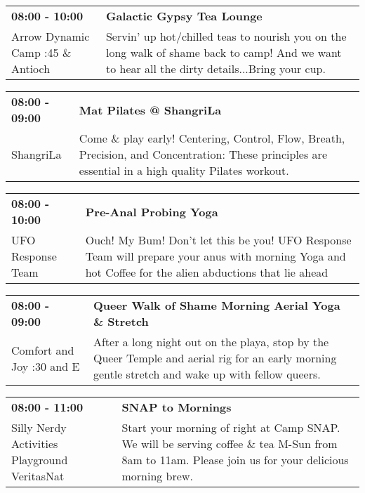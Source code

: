 \begin{tabular}{ p{1in} p{2.2in} }
    \textbf{08:00 - 10:00} & \textbf{Galactic Gypsy Tea Lounge} \\
    Arrow Dynamic Camp \newline 9:45 \& Antioch & Servin' up hot/chilled teas to nourish you on the long walk of shame back to camp! And we want to hear all the dirty details...Bring your cup. \\
    \hline 
\end{tabular}
    
\begin{tabular}{ p{1in} p{2.2in} }
    \textbf{08:00 - 09:00} & \textbf{Mat Pilates @ ShangriLa} \\
    ShangriLa \newline  & Come \& play early! Centering, Control, Flow, Breath, Precision, and Concentration: These principles are essential in a high quality Pilates workout. \\
    \hline 
\end{tabular}
    
\begin{tabular}{ p{1in} p{2.2in} }
    \textbf{08:00 - 10:00} & \textbf{Pre-Anal Probing Yoga} \\
    UFO Response Team \newline  & Ouch! My Bum! Don't let this be you! UFO Response Team will prepare your anus with morning Yoga and hot Coffee for the alien abductions that lie ahead \\
    \hline 
\end{tabular}
    
\begin{tabular}{ p{1in} p{2.2in} }
    \textbf{08:00 - 09:00} & \textbf{Queer Walk of Shame Morning Aerial Yoga \& Stretch} \\
    Comfort and Joy \newline 7:30 and E & After a long night out on the playa, stop by the Queer Temple and aerial rig for an early morning gentle stretch and wake up with fellow queers. \\
    \hline 
\end{tabular}
    
\begin{tabular}{ p{1in} p{2.2in} }
    \textbf{08:00 - 11:00} & \textbf{SNAP to Mornings} \\
    Silly Nerdy Activities Playground \newline VeritasNat & Start your morning of right at Camp SNAP. We will be serving coffee \& tea M-Sun from 8am to 11am. Please join us for your delicious morning brew. \\
    \hline 
\end{tabular}
    
